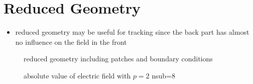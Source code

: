 \section{Reduced Geometry}
\begin{itemize}
  \item reduced geometry may be useful for tracking since the back part has almost no influence on the field in the front
\end{itemize}

\begin{center}
\begin{figure}[H]
  
    \caption{reduced geometry including patches and boundary conditions}
\end{figure}
\end{center}

\begin{center}
\begin{figure}[H]
  
  \caption{absolute value of electric field with $p=2$ nsub=8}
\end{figure}
\end{center}
